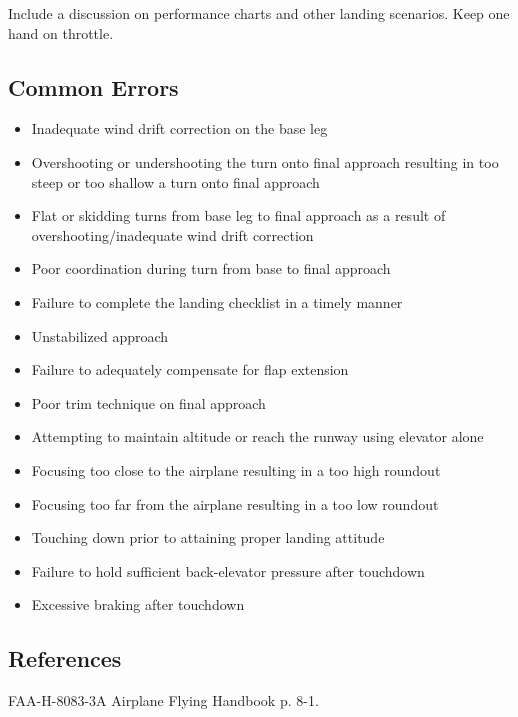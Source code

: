 Include a discussion on performance charts and other landing scenarios. Keep
one hand on throttle.

\subsection{Common Errors}

\begin{itemize}
  \item Inadequate wind drift correction on the base leg
  \item Overshooting or undershooting the turn onto final approach resulting in
    too steep or too shallow a turn onto final approach
  \item Flat or skidding turns from base leg to final approach as a result of
    overshooting/inadequate wind drift correction
  \item Poor coordination during turn from base to final approach
  \item Failure to complete the landing checklist in a timely manner
  \item Unstabilized approach
  \item Failure to adequately compensate for flap extension
  \item Poor trim technique on final approach
  \item Attempting to maintain altitude or reach the runway using elevator
    alone
  \item Focusing too close to the airplane resulting in a too high roundout
  \item Focusing too far from the airplane resulting in a too low roundout
  \item Touching down prior to attaining proper landing attitude
  \item Failure to hold sufficient back-elevator pressure after touchdown
  \item Excessive braking after touchdown
\end{itemize}

\subsection{References}

FAA-H-8083-3A Airplane Flying Handbook p. 8-1.

